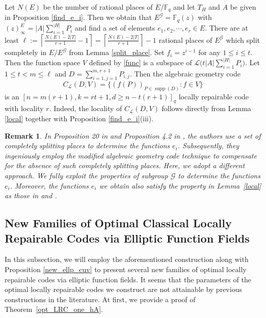 \documentclass[journal,12pt,onecolumn]{IEEEtran}
\newtheorem{remark}{Remark}
\begin{document}
Let \( N(E) \) be the number of rational places of \( E/\mathbb{F}_q \) and let \(T_H\) and \(A\) be given in Proposition \ref{find_e_i}. Then we obtain that \( E^{\mathcal{G}} = \mathbb{F}_q(z) \) with \( (z)^E_\infty = |A|\sum_{i = 1}^{|H|} P_i \) and find a set of elements $e_1, e_2, \cdots, e_r \in E$. There are at least \( \ell := \left\lceil \frac{N(E)-2|T|}{r+1} - 1 \right\rceil = \left\lceil \frac{N(E)-2|T|}{r+1} \right\rceil - 1 \) rational places of \( E^{\mathcal{G}} \) which split completely in \( E/E^{\mathcal{G}} \) from Lemma \ref{split_place}. Set \(f_i = z^{i-1}\) for any \(1\le i\le t\). Then the function space \(V\) defined by \eqref{func} is a subspace of \( \mathcal{L}\big(t|A|\sum_{i = 1}^{|H|} P_i\big)\). Let \( 1 \le t < m \le \ell \) and \( D = \sum_{i=1,j=1}^{m,r+1}P_{i,j} \). Then the algebraic geometry code
\[
    C_{\mathcal{L}}(D,V)=\big\{(f(P))_{P\in\operatorname{supp}(D)}:f\in V\big\}
\]
is an \([n = m(r+1), k = rt+1, d \ge n-t(r+1)]_q\) locally repairable code with locality \( r \). Indeed, the locality of $C_{\mathcal{L}}(D,V)$ follows directly from Lemma \ref{local} together with Proposition \ref{find_e_i}(iii). 

\begin{remark}
    In Proposition 20 in \cite{Optimal_Locally_Repairable_Codes_Via_Elliptic_Curves} and Proposition 4.2 in \cite{MA2023105686}, the authors use a set of completely splitting places to determine the functions \( e_i \). Subsequently, they ingeniously employ the modified algebraic geometry code technique to compensate for the absence of such completely splitting places. Here, we adopt a different approach. We fully exploit the properties of subgroup \( \mathcal{G} \) to determine the functions \( e_i \). Moreover, the functions \( e_i \) we obtain also satisfy the property in Lemma~\ref{local} as those in \cite{Optimal_Locally_Repairable_Codes_Via_Elliptic_Curves} and \cite{MA2023105686}. 
\end{remark}






\subsection{New Families of Optimal Classical Locally Repairable Codes via Elliptic Function Fields}

In this subsection, we will employ the aforementioned construction along with Proposition \ref{new_ellp_cuv} to present several new families of optimal locally repairable codes via elliptic function fields. It seems that the parameters of the optimal locally repairable codes we construct are not attainable by previous constructions in the literature. At first, we provide a proof of Theorem~\ref{opt_LRC_one_hA}. 
\\
\end{document}
